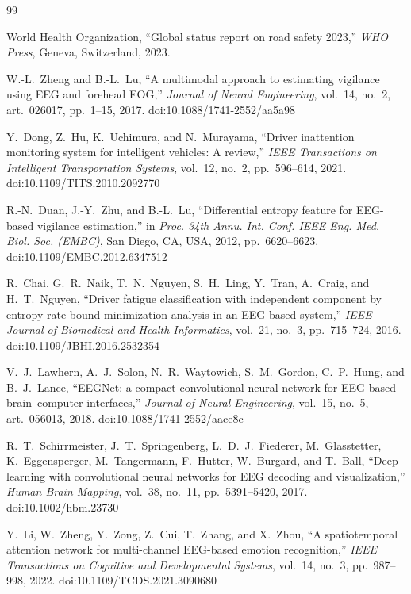 \documentclass[conference]{IEEEtran}
\begin{document}
\begin{thebibliography}{99}
\footnotesize

World Health Organization,
``Global status report on road safety 2023,''
\emph{WHO Press}, Geneva, Switzerland, 2023.

W.-L.~Zheng and B.-L.~Lu,
``A multimodal approach to estimating vigilance using EEG and forehead EOG,''
\emph{Journal of Neural Engineering}, vol.~14, no.~2, art.~026017, pp.~1--15, 2017.
doi:10.1088/1741-2552/aa5a98

Y.~Dong, Z.~Hu, K.~Uchimura, and N.~Murayama,
``Driver inattention monitoring system for intelligent vehicles: A review,''
\emph{IEEE Transactions on Intelligent Transportation Systems}, vol.~12, no.~2, pp.~596--614, 2021.
doi:10.1109/TITS.2010.2092770

R.-N.~Duan, J.-Y.~Zhu, and B.-L.~Lu,
``Differential entropy feature for EEG-based vigilance estimation,''
in \emph{Proc. 34th Annu. Int. Conf. IEEE Eng. Med. Biol. Soc. (EMBC)}, San Diego, CA, USA, 2012, pp.~6620--6623.
doi:10.1109/EMBC.2012.6347512

R.~Chai, G.~R.~Naik, T.~N.~Nguyen, S.~H.~Ling, Y.~Tran, A.~Craig, and H.~T.~Nguyen,
``Driver fatigue classification with independent component by entropy rate bound minimization analysis in an EEG-based system,''
\emph{IEEE Journal of Biomedical and Health Informatics}, vol.~21, no.~3, pp.~715--724, 2016.
doi:10.1109/JBHI.2016.2532354

V.~J.~Lawhern, A.~J.~Solon, N.~R.~Waytowich, S.~M.~Gordon, C.~P.~Hung, and B.~J.~Lance,
``EEGNet: a compact convolutional neural network for EEG-based brain--computer interfaces,''
\emph{Journal of Neural Engineering}, vol.~15, no.~5, art.~056013, 2018.
doi:10.1088/1741-2552/aace8c

R.~T.~Schirrmeister, J.~T.~Springenberg, L.~D.~J.~Fiederer, M.~Glasstetter, K.~Eggensperger, M.~Tangermann, F.~Hutter, W.~Burgard, and T.~Ball,
``Deep learning with convolutional neural networks for EEG decoding and visualization,''
\emph{Human Brain Mapping}, vol.~38, no.~11, pp.~5391--5420, 2017.
doi:10.1002/hbm.23730

Y.~Li, W.~Zheng, Y.~Zong, Z.~Cui, T.~Zhang, and X.~Zhou,
``A spatiotemporal attention network for multi-channel EEG-based emotion recognition,''
\emph{IEEE Transactions on Cognitive and Developmental Systems}, vol.~14, no.~3, pp.~987--998, 2022.
doi:10.1109/TCDS.2021.3090680


\end{thebibliography}
\end{document}
